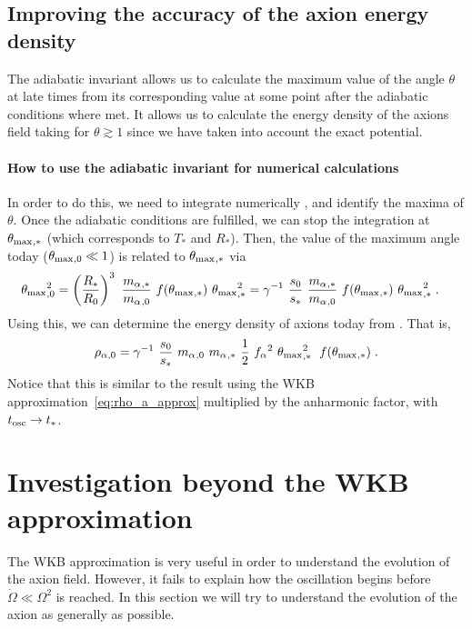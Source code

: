 \documentclass[11pt,a4paper]{article}
\begin{document}
\subsection*{Improving the accuracy of the axion energy density}
%
The adiabatic invariant allows us to calculate the maximum value of the angle $\theta$ at late times from its corresponding value at some point after the adiabatic conditions where met. It allows us to calculate the energy density of the axions field taking for $\theta \gtrsim 1$ since we have taken into account the exact potential.

\paragraph{How to use the adiabatic invariant for numerical calculations}
In order to do this, we need to integrate numerically , and identify the maxima of $\theta$. Once the adiabatic conditions are fulfilled, we can stop the integration at $\theta_{\rm max}{}_{,*}$ (which corresponds to $T_{*}$ and $R_{*}$). Then, the value of the maximum angle today ($\theta_{\rm max}{}_{,0} \ll 1$) is related to $\theta_{\rm max}{}_{,*}$ via
%
\begin{eqnarray}
	\thetamax_{,0}^2 &=  \lrb{\dfrac{R_*}{R_0}}^3 \ \dfrac{\ma_{,*}}{\ma_{,0}} \ f(\thetamax_{,*}) \ \thetamax_{,*}^2  =
			    \gamma^{-1} \ \dfrac{s_0}{s_*} \ \dfrac{\ma_{,*}}{\ma_{,0}} \ f(\thetamax_{,*}) \ \thetamax_{,*}^2 
	\; .
	\label{eq:theta_relation}
\end{eqnarray}
%
Using this, we can determine the energy density of axions today  from . That is,
%
\begin{equation}
	\rho_{\alpha,0} = \gamma^{-1} \ \dfrac{s_0}{s_*} \ \ma_{,0} \ \ma_{,*} \ \dfrac{1}{2} \ \fa^2 \ \thetamax_{,*}^2 \;  \ f(\thetamax_{,*}) \;.
	\label{eq:rho_axion_exact}
\end{equation}
%
Notice that this is similar to the result using the WKB approximation~\ref{eq:rho_a_approx} multiplied by the anharmonic factor, with $t_{\rm osc}{} \to t_*$.


\section{Investigation beyond the WKB approximation}\label{sec:beyond_WKB}
\setcounter{equation}{0}
%
The WKB approximation is very useful in order to understand the evolution of the axion field. However, it fails to explain how the oscillation begins before $\dot \Omega \ll \Omega^2$ is reached. In this section we will try to understand the evolution of the axion as generally as possible. 
\end{document}
